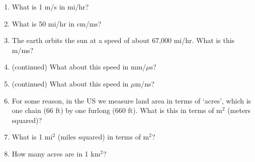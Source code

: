 \documentclass[12pt, letterpaper]{article}
\begin{document}
\begin{enumerate}

\item What is 1 m/s in mi/hr?

\answergrid{5cm}
\item What is 50 mi/hr in cm/ms?

\answergrid{5cm}
\item The earth orbits the sun at a speed of about 67,000 mi/hr.  What is this m/ms?

\answergrid{5cm}
\item (continued) What about this speed in mm/$\mu$s?

\answergrid{5cm}
\item (continued) What about this speed in $\mu$m/ns?

\answergrid{5cm}
\item For some reason, in the US we measure land area in terms of `acres', which is one chain (66 ft) by one furlong (660 ft).
What is this in terms of m$^2$ (meters squared)?

\answergrid{5cm}
\item What is 1 mi$^2$ (miles squared) in terms of m$^2$?

\answergrid{5cm}
\item How many acres are in 1 km$^2$?

\fillanswergrid
%
%

\end{enumerate}

%
\end{document}
